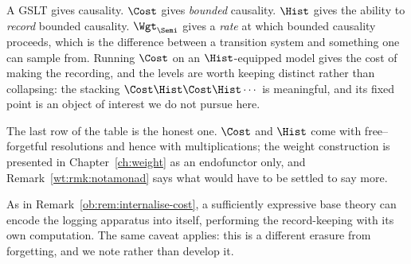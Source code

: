 A GSLT gives causality. $\Cost$ gives \emph{bounded} causality. $\Hist$ gives the ability
to \emph{record} bounded causality. $\Wgt_{\Semi}$ gives a \emph{rate} at which bounded
causality proceeds, which is the difference between a transition system and something one
can sample from. Running $\Cost$ on an $\Hist$-equipped model gives the
cost of making the recording, and the levels are worth keeping distinct rather than
collapsing: the stacking $\Cost\Hist\Cost\Hist\cdots$ is meaningful, and its fixed point
is an object of interest we do not pursue here.

The last row of the table is the honest one. $\Cost$ and $\Hist$ come with free--forgetful
resolutions and hence with multiplications; the weight construction is presented in
Chapter~\ref{ch:weight} as an endofunctor only, and Remark~\ref{wt:rmk:notamonad} says
what would have to be settled to say more.

\begin{remark}
As in Remark~\ref{ob:rem:internalise-cost}, a sufficiently expressive base theory can encode
the logging apparatus into itself, performing the record-keeping with its own
computation. The same caveat applies: this is a different erasure from forgetting, and we
note rather than develop it.
\end{remark}
